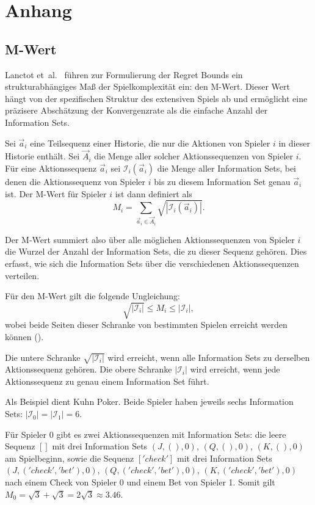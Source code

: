 \chapter{Anhang}
\label{chap:anhang}

\section{M-Wert}
\label{anhang:mwert}
Lanctot et~al.~\cite{lanctot2009monte} führen zur Formulierung der Regret Bounds ein strukturabhängiges Maß der Spielkomplexität ein: den M-Wert.
Dieser Wert hängt von der spezifischen Struktur des extensiven Spiels ab und ermöglicht eine präzisere Abschätzung der Konvergenzrate als die einfache Anzahl der Information Sets.

Sei $\vec{a}_i$ eine Teilsequenz einer Historie, die nur die Aktionen von Spieler $i$ in dieser Historie enthält.
Sei $\vec{A}_i$ die Menge aller solcher Aktionssequenzen von Spieler $i$.
Für eine Aktionssequenz $\vec{a}_i$ sei $\mathcal{I}_i(\vec{a}_i)$ die Menge aller Information Sets, bei denen die Aktionssequenz von Spieler $i$ bis zu diesem Information Set genau $\vec{a}_i$ ist.
Der M-Wert für Spieler $i$ ist dann definiert als
\begin{equation}
M_i = \sum_{\vec{a}_i \in \vec{A}_i} \sqrt{|\mathcal{I}_i(\vec{a}_i)|}.
\end{equation}

Der M-Wert summiert also über alle möglichen Aktionssequenzen von Spieler $i$ die Wurzel der Anzahl der Information Sets, die zu dieser Sequenz gehören.
Dies erfasst, wie sich die Information Sets über die verschiedenen Aktionssequenzen verteilen.

Für den M-Wert gilt die folgende Ungleichung:
\begin{equation}
\sqrt{|\mathcal{I}_i|} \le M_i \le |\mathcal{I}_i|,
\end{equation}
wobei beide Seiten dieser Schranke von bestimmten Spielen erreicht werden können (\cite{lanctot2009monte}).

Die untere Schranke $\sqrt{|\mathcal{I}_i|}$ wird erreicht, wenn alle Information Sets zu derselben Aktionssequenz gehören.
Die obere Schranke $|\mathcal{I}_i|$ wird erreicht, wenn jede Aktionssequenz zu genau einem Information Set führt.

Als Beispiel dient Kuhn Poker.
Beide Spieler haben jeweils sechs Information Sets: $|\mathcal{I}_0| = |\mathcal{I}_1| = 6$.

Für Spieler 0 gibt es zwei Aktionssequenzen mit Information Sets:
die leere Sequenz $[]$ mit drei Information Sets $(J, (), 0)$, $(Q, (), 0)$, $(K, (), 0)$ am Spielbeginn,
sowie die Sequenz $['check']$ mit drei Information Sets $(J, ('check', 'bet'), 0)$, $(Q, ('check', 'bet'), 0)$, $(K, ('check', 'bet'), 0)$ nach einem Check von Spieler 0 und einem Bet von Spieler 1.
Somit gilt $M_0 = \sqrt{3} + \sqrt{3} = 2\sqrt{3} \approx 3.46$.

